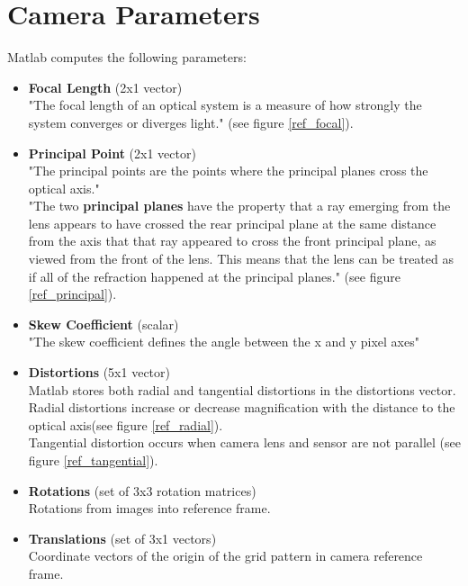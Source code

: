 \documentclass[paper=a4, fontsize=11pt]{scrartcl} %
\numberwithin{equation}{section} %
\numberwithin{figure}{section} %
\numberwithin{table}{section} %
\begin{document}
\section{Camera Parameters}
Matlab computes the following parameters:
\begin{itemize}
	\item \textbf{Focal Length} (2x1 vector)\\
	"The focal length of an optical system is a measure of how strongly the system converges or diverges light." \cite{wiki} (see figure \ref{ref_focal}).
	
	\item \textbf{Principal Point} (2x1 vector)\\
	"The principal points are the points where the principal planes cross the optical axis."\cite{wiki}\\
	"The two \textbf{principal planes} have the property that a ray emerging from the lens appears to have crossed the rear principal plane at the same distance from the axis that that ray appeared to cross the front principal plane, as viewed from the front of the lens. This means that the lens can be treated as if all of the refraction happened at the principal planes."\cite{wiki} (see figure \ref{ref_principal}).
	
	\item \textbf{Skew Coefficient} (scalar)\\
	"The skew coefficient defines the angle between the x and y pixel axes"\cite{calibration}
	
	
	\item \textbf{Distortions} (5x1 vector)\\
	Matlab stores both radial and tangential distortions in the distortions vector.\cite{calibration}\\
	Radial distortions increase or decrease magnification with the distance to the optical axis\cite{wiki}(see figure \ref{ref_radial}).\\
	Tangential distortion occurs when camera lens and sensor are not parallel (see figure \ref{ref_tangential}).
	
	\item \textbf{Rotations} (set of 3x3 rotation matrices)\\
	Rotations from images into reference frame.\cite{calibration}
	
	\item \textbf{Translations} (set of 3x1 vectors)\\
	Coordinate vectors of the origin of the grid pattern in camera reference frame. \cite{calibration}
	
\end{itemize}
\end{document}
